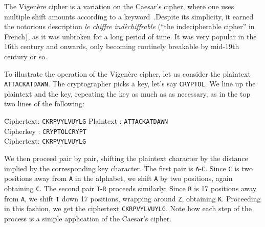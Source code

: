 
The Vigen\`{e}re cipher is a variation on the Caesar's cipher, where
one uses multiple shift amounts according to a
keyword~\cite{wiki:vigenere}.\indVigenere Despite its simplicity, it
earned the notorious description {\em le chiffre ind\`{e}chiffrable}
(``the indecipherable cipher'' in French), as it was unbroken for a
long period of time. It was very popular in the 16th century and
onwards, only becoming routinely breakable by mid-19th century or so.

To illustrate the operation of the Vigen\`{e}re cipher, let us
consider the plaintext {\tt ATTACKATDAWN}. The cryptographer picks a
key, let's say {\tt CRYPTOL}. We line up the plaintext and the key,
repeating the key as much as as necessary, as in the top two lines of
the following:
\begin{tabbing}
\hspace*{2cm} \= Ciphertext: \hspace*{.5cm} \= {\tt CKRPVYLVUYLG} \kill 
\> Plaintext : \> {\tt ATTACKATDAWN} \\
\> Cipherkey : \> {\tt CRYPTOLCRYPT} \\
\> Ciphertext: \> {\tt CKRPVYLVUYLG}
\end{tabbing}
We then proceed pair by pair, shifting the plaintext character by the
distance implied by the corresponding key character.  The first pair
is {\tt A}-{\tt C}.  Since {\tt C} is two positions away from {\tt A}
in the alphabet, we shift {\tt A} by two positions, again obtaining
{\tt C}.  The second pair {\tt T}-{\tt R} proceeds similarly: Since
{\tt R} is 17 positions away from {\tt A}, we shift {\tt T} down 17
positions, wrapping around {\tt Z}, obtaining {\tt K}.  Proceeding in
this fashion, we get the ciphertext {\tt CKRPVYLVUYLG}. Note how each
step of the process is a simple application of the Caesar's
cipher.\indCaesarscipher


